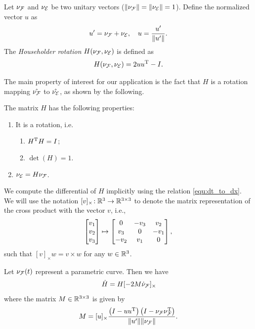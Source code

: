 \documentclass[journal]{IEEEtran}  %
\begin{document}
  \begin{definition} Let $\nu_{\mathcal{F}}$ and $\nu_{\mathcal{E}}$ be two unitary vectors ($\lVert\nu_{\mathcal{F}}\rVert=\lVert\nu_{\mathcal{E}}\rVert=1$). Define the normalized vector $u$ as
    \begin{equation}
      u'=\nu_{\mathcal{F}}+\nu_{\mathcal{E}},\quad u =\frac{u'}{\lVert u'\rVert}.
    \end{equation}
    The \emph{Householder rotation} $H(\nu_{\mathcal{F}},\nu_{\mathcal{E}})$ is defined as
    \begin{equation}\label{eq:H definition}
      H(\nu_{\mathcal{F}},\nu_{\mathcal{E}}) = 2 u u^\mathrm{T}-I.
    \end{equation}
  \end{definition}
  The main property of interest for our application is the fact that $H$ is a rotation mapping $\hat{\nu_{\mathcal{F}}}$ to $\hat{\nu_{\mathcal{E}}}$, as shown by the following.
  \begin{proposition}\label{prop:HProperidy}
    The matrix $H$ has the following properties:
    \begin{enumerate}
    \item It is a rotation, i.e.
      \begin{enumerate}
      \item\label{it:orthonormality} $H^\mathrm{T} H=I$;
      \item\label{it:determinant} $\det(H)=1$.
      \end{enumerate}
    \item\label{it:transformation} $\nu_{\mathcal{E}}=H \nu_{\mathcal{F}}$.
    \end{enumerate}
  \end{proposition}

  We compute the differential of $H$ implicitly using the relation \eqref{equ:dt_to_dx}. We will use the notation $[v]_{\times}\!:\mathbb{R}^{3}{}\to\mathbb{R}^{3\times 3}{}$ to denote the matrix representation of the cross product with the vector $v$, i.e.,
  \begin{equation}
    \begin{bmatrix}v_1\\v_2\\v_3\end{bmatrix}\mapsto \begin{bmatrix}0 & -v_3 &v_2\\v_3 & 0 & -v_1\\-v_2 & v_1 & 0\end{bmatrix},
  \end{equation}
  such that $[v]_\times w=v\times w$ for any $w\in\mathbb{R}^{3}{}$. %
  \begin{proposition}\label{prop:Hderivitive}
    Let $\nu_{\mathcal{F}}(t)$ represent a parametric curve. Then we have
    \begin{equation}
      \dot{H}=H[-2M\dot{\nu}_{\mathcal{F}}]_{\times}\!
    \end{equation}
    where the matrix $M\in\mathbb{R}^{3\times3}{}$ is given by
    \begin{equation}
      M=[u]_{\times}  \frac{ \left( I - u u^\mathrm{T} \right) \left( I- \nu_{\mathcal{F}} \nu_{\mathcal{F}}^\mathrm{T} \right)} {\lVert u'\rVert \lVert\nu_{\mathcal{F}}\rVert}.
    \end{equation}
  \end{proposition}
\end{document}
